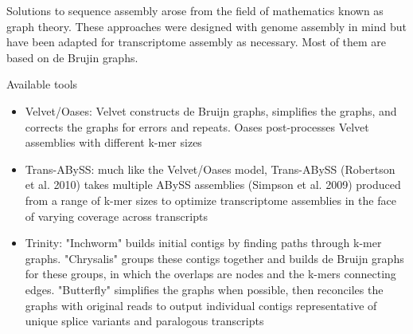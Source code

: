 \documentclass{beamer}\usepackage[]{graphicx}\usepackage[]{color}
\begin{document}
\begin{frame}
\begin{displayquote}
\footnotesize
Solutions to sequence assembly arose from the field of mathematics known as graph theory. These approaches were designed with genome assembly in mind but have been adapted for transcriptome assembly as necessary. Most of them are based on de Brujin graphs. 
\end{displayquote}
\begin{block}{Available tools}
\begin{itemize}
\footnotesize
\item Velvet/Oases: Velvet constructs de Bruijn graphs, simplifies the graphs, and corrects the graphs for errors and repeats. Oases post-processes Velvet assemblies with different k-mer sizes
\item Trans-ABySS: much like the Velvet/Oases model, Trans-ABySS (Robertson et al. 2010) takes multiple ABySS assemblies (Simpson et al. 2009) produced from a range of k-mer sizes to optimize transcriptome assemblies in the face of varying coverage across transcripts
\item Trinity: "Inchworm" builds initial contigs by finding paths through k-mer graphs. "Chrysalis" groups these contigs together and builds de Bruijn graphs for these groups, in which the overlaps are nodes and the k-mers connecting edges. "Butterfly" simplifies the graphs when possible, then reconciles the graphs with original reads to output individual contigs representative of unique splice variants and paralogous transcripts
\end{itemize}
\end{block}
\vspace{5mm}
\end{frame}
\end{document}
